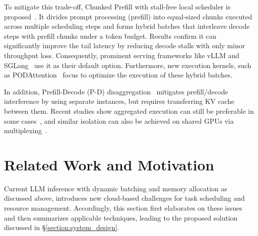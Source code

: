 \documentclass[sigconf, review, anonymous]{acmart}
\begin{document}
To mitigate this trade-off, Chunked Prefill with stall-free local scheduler is proposed~\cite{agrawal2023sarathiefficientllminference, agrawal2024tamingthroughputlatencytradeoffllm}. It divides prompt processing (prefill) into equal-sized chunks executed across multiple scheduling steps and forms hybrid batches that interleave decode steps with prefill chunks under a token budget. Results confirm it can significantly improve the tail latency by reducing decode stalls with only minor throughput loss. Consequently, prominent serving frameworks like vLLM and SGLang~\cite{sglang} use it as their default option. Furthermore, new execution kernels, such as PODAttention~\cite{podAttention} focus to optimize the execution of these hybrid batches.

In addition, Prefill-Decode (P-D) disaggregation~\cite{disServe, patel2024splitwiseefficientgenerativellm, qin2024mooncakekvcachecentricdisaggregatedarchitecture} mitigates prefill/decode interference by using separate instances, but requires transferring KV cache between them. Recent studies show aggregated execution can still be preferable in some cases~\cite{wang2025prefilldecodeaggregationdisaggregationunifying}, and similar isolation can also be achieved on shared GPUs via multiplexing~\cite{gao2025duetserveharmonizingprefilldecode}.

\section{Related Work and Motivation}\label{section:scheduling_issues}

Current LLM inference with dynamic batching and memory allocation as discussed above, introduces new cloud-based challenges for task scheduling and resource management. Accordingly, this section first elaborates on these issues and then summarizes applicable techniques, leading to the proposed solution discussed in \S\ref{section:system_design}.
\end{document}
